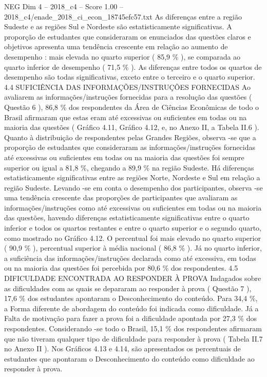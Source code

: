 \begin{textsample}{NEG Dim 4 – 2018\_c4 – Score 1.00 – 2018\_c4/enade\_2018\_ci\_econ\_18745efc57.txt}
As diferenças entre a região Sudeste e as regiões Sul e Nordeste são estatisticamente significativas.
A proporção de estudantes que consideraram os enunciados das questões claros e objetivos apresenta uma tendência crescente em relação ao aumento de desempenho : mais elevada no quarto superior ( 85,9 \% ), se comparada ao quarto inferior de desempenho ( 71,5 \% ).
As diferenças entre todos os quartos de desempenho são todas significativas, exceto entre o terceiro e o quarto superior. 4.4 SUFICIÊNCIA DAS INFORMAÇÕES/INSTRUÇÕES FORNECIDAS Ao avaliarem as informações/instruções fornecidas para a resolução das questões ( Questão 6 ), 86,8 \% dos respondentes da Área de Ciências Econômicas de todo o Brasil afirmaram que estas eram até excessivas ou suficientes em todas ou na maioria das questões ( Gráfico 4.11, Gráfico 4.12, e, no Anexo II, a Tabela II.6 ).
Quanto à distribuição de respondentes pelas Grandes Regiões, observa -se que a proporção de estudantes que consideraram as informações/instruções fornecidas até excessivas ou suficientes em todas ou na maioria das questões foi sempre superior ou igual a 81,8 \%, chegando a 89,9 \% na região Sudeste.
Há diferenças estatisticamente significativas entre as regiões Norte, Nordeste e Sul em relação a região Sudeste.
Levando -se em conta o desempenho dos participantes, observa -se uma tendência crescente das proporções de participantes que avaliaram as informações/instruções como até excessivas ou suficientes em todas ou na maioria das questões, havendo diferenças estatisticamente significativas entre o quarto inferior e todos os quartos restantes e entre o quarto superior e o segundo quarto, como mostrado no Gráfico 4.12.
O percentual foi mais elevado no quarto superior ( 90,9 \% ), percentual superior à média nacional ( 86,8 \% ).
Já no quarto inferior, a suficiência das informações/instruções declarada como até excessiva, em todas ou na maioria das questões foi percebida por 80,6 \% dos respondentes. 4.5 DIFICULDADE ENCONTRADA AO RESPONDER À PROVA Indagados sobre as dificuldades com as quais se depararam ao responder à prova ( Questão 7 ), 17,6 \% dos estudantes apontaram o Desconhecimento do conteúdo.
Para 34,4 \%, a Forma diferente de abordagem do conteúdo foi indicada como dificuldade.
Já a Falta de motivação para fazer a prova foi a dificuldade apontada por 27,3 \% dos respondentes.
Considerando -se todo o Brasil, 15,1 \% dos respondentes afirmaram que não tiveram qualquer tipo de dificuldade para responder à prova ( Tabela II.7 no Anexo II ).
Nos Gráficos 4.13 e 4.14, são apresentados os percentuais de estudantes que apontaram o Desconhecimento do conteúdo como dificuldade ao responder à prova.

\end{textsample}
